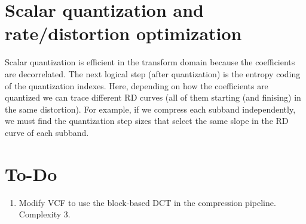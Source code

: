 \section{Scalar quantization and rate/distortion optimization}

Scalar quantization is efficient in the transform domain because the
coefficients are decorrelated. The next logical step (after
quantization) is the entropy coding of the quantization indexes. Here,
depending on how the coefficients are quantized we can trace different
RD curves (all of them starting (and finising) in the same
distortion). For example, if we compress each subband independently,
we must find the quantization step sizes that select the same slope in
the RD curve of each subband.

\section{To-Do}
\begin{enumerate}
\item Modify VCF to use the block-based DCT in the compression pipeline. Complexity 3.
\end{enumerate}

